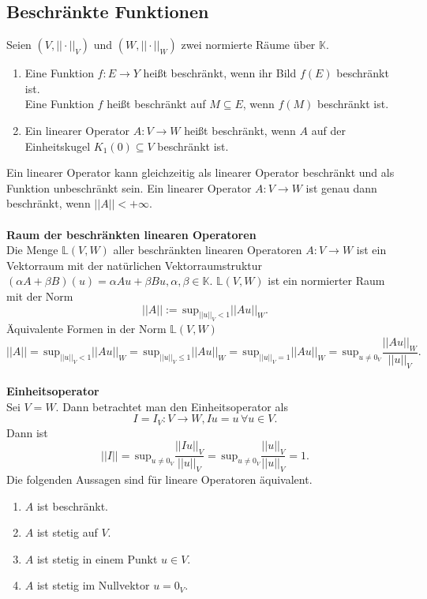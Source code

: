 \documentclass[a4paper,12pt]{article}
\begin{document}
\subsection{Beschränkte Funktionen}
Seien $(V,||\cdot ||_V)$ und $(W,||\cdot ||_W)$ zwei normierte Räume über $\mathbb{K}$. 
\begin{enumerate}[label=\arabic*.]
        \item Eine Funktion $f:E\rightarrow Y$ heißt beschränkt, wenn ihr Bild $f(E)$ beschränkt ist.\\ Eine Funktion $f$ heißt beschränkt auf $M\subseteq E$, wenn $f(M)$ beschränkt ist.
        \item Ein linearer Operator $A:V\rightarrow W$ heißt beschränkt, wenn $A$ auf der Einheitskugel $K_1(0)\subseteq V$ beschränkt ist.
\end{enumerate}
Ein linearer Operator kann gleichzeitig als linearer Operator beschränkt und als Funktion unbeschränkt sein. Ein linearer Operator $A:V\rightarrow W$ ist genau dann beschränkt, wenn $||A||<+\infty$.
\\\hfill\\\textbf{Raum der beschränkten linearen Operatoren}\\ 
Die Menge $\mathbb{L}(V,W)$ aller beschränkten linearen Operatoren $A:V\rightarrow W$ ist ein Vektorraum mit der natürlichen Vektorraumstruktur $(\alpha A+\beta B)(u)=\alpha Au+\beta Bu,\alpha ,\beta  \in \mathbb{K}$. $\mathbb{L}(V,W)$ ist ein normierter Raum mit der Norm
\[ 
        ||A||:=\,\text{sup}_{||u||_V<1}||Au||_W
.\] 
Äquivalente Formen in der Norm $\mathbb{L}(V,W)$ 
\[ 
        ||A||=\,\text{sup}_{||u||_V<1}||Au||_W=\,\text{sup}_{||u||_V\leq 1}||Au||_W=\,\text{sup}_{||u||_V=1}||Au||_W=\,\text{sup}_{u\neq 0_V}\dfrac{||Au||_W}{||u||_V}
.\] 
\hfill\\\textbf{Einheitsoperator}\\ 
Sei $V=W$. Dann betrachtet man den Einheitsoperator als
\[ 
        I=I_V:V\rightarrow W,Iu=u\,\forall u \in V
.\] 
Dann ist
\[ 
        ||I||=\,\text{sup}_{u\neq 0_V}\dfrac{||Iu||_V}{||u||_V}=\,\text{sup}_{u\neq 0_V}\dfrac{||u||_V}{||u||_V}=1
.\] 
Die folgenden Aussagen sind für lineare Operatoren äquivalent.
\begin{enumerate}[label=\arabic*.]
        \item $A$ ist beschränkt.
        \item $A$ ist stetig auf $V$. 
        \item $A$ ist stetig in einem Punkt $u \in V$.
        \item $A$ ist stetig im Nullvektor $u=0_V$.
\end{enumerate}
\end{document}
